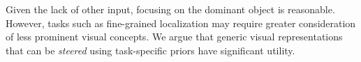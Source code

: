 
Given the lack of other input, focusing on the dominant object is reasonable. %
However, tasks such as fine-grained localization may require greater consideration of less prominent visual concepts.
We argue that generic visual representations that can be \textit{steered} using task-specific priors have significant utility.


